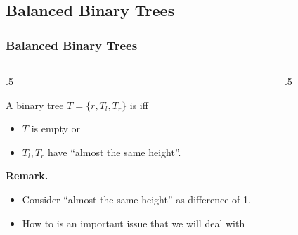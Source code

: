 \documentclass[10pt]{beamer}
\begin{document}
\subsection{Balanced Binary Trees}
\begin{frame}[t]\frametitle{Balanced Binary Trees}
	\vspace{-0.5cm}
	\begin{columns}[T] %
	\begin{column}{.5\linewidth} %
		\begin{definition}
			 A binary tree $T = \{ r, T_{l}, T_{r} \}$ is  
			 iff
			\begin{itemize}
			
				\item
				$T$ is empty or
			
				\item
				$T_{l}, T_{r}$ have ``almost the same height''.
			\end{itemize}		 
		\end{definition}
		
		\textbf{Remark.}
		\begin{itemize}
			
			\item 
			Consider ``almost the same height'' as difference of 1.

			\item			
			How to  is an important issue that 
			we will deal with

		\end{itemize}
		
	\end{column} %
	\begin{column}{.5\linewidth} %
		\begin{example}
		{\scriptsize
			\begin{figure}[htbp]
			\begin{center}
				
			\end{center}
			\end{figure}
		} %
		\end{example}
	\end{column} %
	\end{columns} %
\end{frame}
\end{document}
